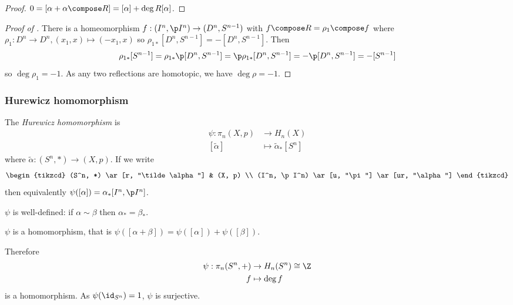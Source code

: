 \documentclass[a4paper]{article}
\renewcommand{\b}{\p}
\begin{document}
\begin{proof}
  \(0 = [\alpha + \alpha \compose R] = [\alpha] + \deg R [\alpha]\).
\end{proof}

\begin{proof}[Proof of ]
  There is a homeomorphism \(f: (I^n, \b I^n) \to (D^n, S^{n - 1})\) with \(f \compose R = \rho_1 \compose f\) where \(\rho_1: D^n \to D^n, (x_1, x) \mapsto (-x_1, x)\) so \(\rho_{1*}[D^n, S^{n - 1}] = - [D^n, S^{n - 1}]\). Then
  \[
    \rho_{1*}[S^{n - 1}] = \rho_{1*} \b [D^n, S^{n - 1}] = \b \rho_{1*} [D^n, S^{n - 1}] = - \b [D^n, S^{n - 1}] = -[S^{n - 1}]
  \]
  so \(\deg \rho_1 = -1\). As any two reflections are homotopic, we have \(\deg \rho = -1\).
\end{proof}

\subsubsection{Hurewicz homomorphism}

\begin{definition}
  The \emph{Hurewicz homomorphism} is
  \begin{align*}
    \psi: \pi_n(X, p) &\to H_n(X) \\
    [\tilde \alpha] &\mapsto \tilde \alpha_*[S^n]
  \end{align*}
  where \(\tilde \alpha: (S^n, *) \to (X, p)\). If we write
  \[
    \begin{tikzcd}
      (S^n, *) \ar[r, "\tilde \alpha"] & (X, p) \\
      (I^n, \b I^n) \ar[u, "\pi"] \ar[ur, "\alpha"]
    \end{tikzcd}
  \]
  then equivalently \(\psi([\alpha]) = \alpha_*[I^n, \b I^n]\).
\end{definition}

\(\psi\) is well-defined: if \(\alpha \sim \beta\) then \(\alpha_* = \beta_*\).

\begin{proposition}
  \label{prop:Hurewicz homomorphism}
  \(\psi\) is a homomorphism, that is  \(\psi([\alpha + \beta]) = \psi([\alpha]) + \psi([\beta])\).
\end{proposition}

Therefore
\begin{align*}
  \psi: \pi_n(S^n, +) &\to H_n(S^n) \cong \Z \\
  f &\mapsto \deg f
\end{align*}
is a homomorphism. As \(\psi(\id_{S^n}) = 1\), \(\psi\) is surjective.
\end{document}
